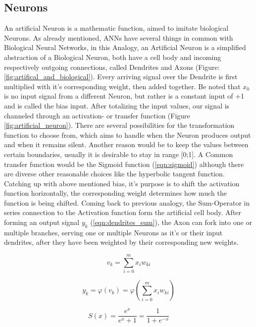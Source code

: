 \subsection{Neurons}
An artificial Neuron is a mathematic function, aimed to imitate biological Neurons.
As already mentioned, ANNs have several things in common with Biological Neural Networks, in this Analogy, an Artificial Neuron is a simplified abstraction of a Biological Neuron, both have a cell body and incoming respectively outgoing connections, called Dendrites and Axons \cite{nntutorial} (Figure: \ref{fig:artifical_and_biological}). Every arriving signal over the Dendrite is first multiplied with it's corresponding weight, then added together. Be noted that $x_{0}$ is no input signal from a different Neuron, but rather is a constant input of +1 and is called the bias input. \newline
After totalizing the input values, our signal is channeled through an activation- or transfer function (Figure \ref{fig:artificial_neuron}). There are several possibilities for the transformation function to choose from, which aims to handle when the Neuron produces output and when it remains silent. Another reason would be to keep the values between certain boundaries, usually it is desirable to stay in range [0;1]. A Common transfer function would be the Sigmoid function (\ref{eqn:sigmoid}) although there are diverse other reasonable choices like the hyperbolic tangent function. Catching up with above mentioned bias, it's purpose is to shift the activation function horizontally, the corresponding weight determines how much the function is being shifted. Coming back to previous analogy, the Sum-Operator in series connection to the Activation function form the artificial cell body.\newline 
After forming an output signal $y_{k}$ (\ref{eqn:dendrites_sum}), the Axon can fork into one or multiple branches, serving one or multiple Neurons as it's or their input dendrites, after they have been weighted by their corresponding new weights.   


\begin{equation}
\label{eqn:vk}
	v_{k} = \sum_{i=0}^{m} x_{i} w_{ki}
\end{equation}  

\begin{equation}
	\label{eqn:dendrites_sum}
	y_{k} = \varphi(v_{k}) = \varphi(\sum_{i=0}^{m} x_{i} w_{ki}) 
\end{equation} 

\begin{equation}
	\label{eqn:sigmoid}
	S(x) = \frac{e^x}{e^x + 1} = \frac{1}{1 + e^{-x}}
\end{equation} 


